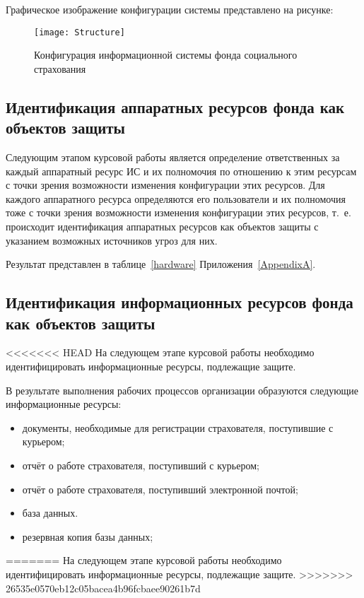 \point Графическое изображение конфигурации системы представлено на рисунке:

\begin{figure}[h]
  \centering
  \texttt{[image: Structure]}
  \caption{Конфигурация информационной системы фонда социального страхования}
  \label{fig:structure}  
\end{figure}

\subsection{Идентификация аппаратных ресурсов
  фонда как объектов защиты}

\point Следующим этапом курсовой работы является определение ответственных за каждый аппаратный ресурс ИС и их полномочия по отношению к этим ресурсам с точки зрения возможности изменения конфигурации этих ресурсов. Для каждого аппаратного ресурса определяются его пользователи и их полномочия тоже с точки зрения возможности изменения конфигурации этих ресурсов, т.~е. происходит идентификация аппаратных ресурсов как объектов защиты с указанием возможных источников угроз для них.

\point Результат представлен в таблице~\ref{hardware} Приложения~\ref{AppendixA}.

\subsection{Идентификация информационных ресурсов
  фонда как объектов защиты}

<<<<<<< HEAD
\point На следующем этапе курсовой работы необходимо идентифицировать
информационные ресурсы, подлежащие защите.

\point В результате выполнения рабочих процессов организации
образуются следующие информационные ресурсы:

\begin{itemize}
\item документы, необходимые для регистрации страхователя, поступившие
  с курьером;
\item отчёт о работе страхователя, поступивший с курьером;
\item отчёт о работе страхователя, поступивший электронной почтой;
\item база данных.
\item резервная копия базы данных;
\end{itemize}
=======
\point На следующем этапе курсовой работы необходимо идентифицировать информационные ресурсы, подлежащие защите.
>>>>>>> 26535e0570eb12c05bacea4b96fcbaee90261b7d

